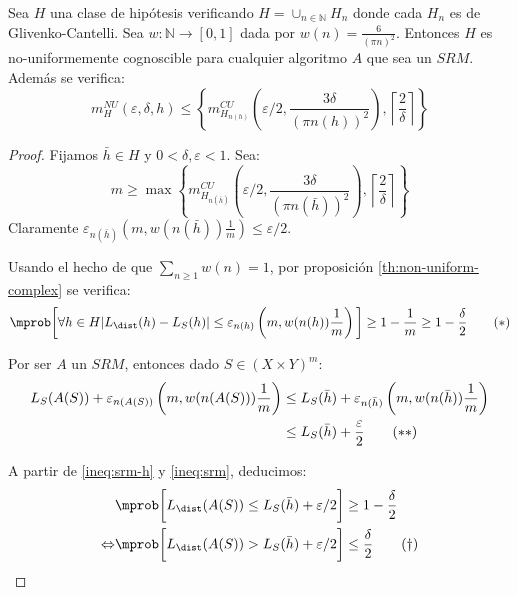\begin{theorem}
Sea $H$ una clase de hipótesis verificando $H = \cup_{n\in \mathbb{N}} H_n$ donde cada 
$H_n$ es de Glivenko-Cantelli. Sea $w : \mathbb{N} \rightarrow [0,1]$ dada por $w(n) = \frac{6}{(\pi n)^2}$. 
Entonces $H$ es no-uniformemente cognoscible para cualquier algoritmo $A$ que sea un $SRM$. Además se verifica:
\[
  m_{H}^{NU} (\varepsilon, \delta, h) \le \left\{m_{H_{n(h)}}^{CU} \left(\varepsilon/2, \frac{3 \delta}{(\pi n(h))^2} \right), 
  \left\lceil\frac{2}{\delta}\right\rceil \right\}
\]
\label{th:srm-suficientes}
\end{theorem}
  \begin{proof}
   Fijamos $\bar{h}\in H$ y $0 < \delta, \varepsilon < 1$. Sea:
   \[
     m \ge \max\left\{m_{H_{n(\bar{h})}}^{CU} \left(\varepsilon/2, \frac{3 \delta}{(\pi n(\bar{h}))^2} \right), 
         \left\lceil\frac{2}{\delta}\right\rceil \right\}
   \]
   Claramente $\varepsilon_{n(\bar{h})}\left(m, w(n(\bar{h})) \frac{1}{m}\right) \le \varepsilon/2$.

   Usando el hecho de que $\sum_{n\ge 1} w(n) = 1$, por proposición \ref{th:non-uniform-complex} se verifica:    
   \begin{equation}
     \mprob \bigg[\forall h\in H |L_{\dist}(h) - L_S(h)| \le \varepsilon_{n(h)} \left(m, w(n(h)) \frac{1}{m}\right)\bigg] 
     \ge 1-\frac{1}{m} \ge 1 - \frac{\delta}{2}
   \label{ineq:srm-h}\tag{\textrm{$\ast$}}
   \end{equation}
   
   Por ser $A$ un $SRM$, entonces dado $S\in (X\times Y)^m$:
   \begin{align}
     L_{S}(A(S)) + \varepsilon_{n(A(S))} \left(m, w(n(A(S)))\frac{1}{m}\right)
                     &\le L_S(\bar{h}) + \varepsilon_{n(\bar{h})} \left(m, w(n(\bar{h}))\frac{1}{m}\right) \nonumber\\
                     &\le L_S(\bar{h}) + \frac{\varepsilon}{2}
     \label{ineq:srm}\tag{\textrm{$\ast$$\ast$}}
   \end{align}
   
   A partir de \eqref{ineq:srm-h} y \eqref{ineq:srm}, deducimos:
   \begin{align}
                     &\mprob \bigg[L_{\dist}(A(S)) \le L_{S}(\bar{h}) + \varepsilon/2\bigg] \ge 1-\frac{\delta}{2} \nonumber\\
     \Leftrightarrow &\mprob \bigg[L_{\dist}(A(S)) > L_{S}(\bar{h}) + \varepsilon/2\bigg] \le \frac{\delta}{2}
     \label{ineq:LDbound}\tag{\textrm{$\dagger$}}
   \end{align}
   

\end{proof}
